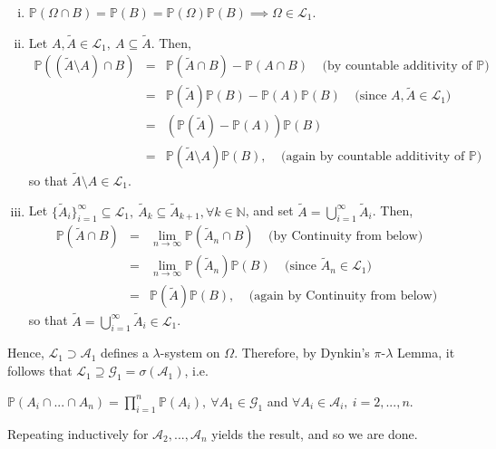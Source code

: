 \documentclass{article}
\begin{document}
\begin{enumerate}[(i)]
	\item $\mathbb{P}(\Omega \cap B) = \mathbb{P}(B) = \mathbb{P}(\Omega)\mathbb{P}(B) \implies \Omega \in \mathcal{L}_1$.
	\item Let $A,\tilde{A} \in \mathcal{L}_1, \ A \subseteq \tilde{A}$. Then,
	\begin{eqnarray}
	\nonumber
	\mathbb{P}((\tilde{A} \setminus A) \cap B) &=& \mathbb{P}(\tilde{A} \cap B) - \mathbb{P}(A \cap B) \ \ \ \ \ \text{(by countable additivity of $\mathbb{P}$)}\\
	\nonumber
	&=& \mathbb{P}(\tilde{A})\mathbb{P}(B) - \mathbb{P}(A)\mathbb{P}(B) \ \ \ \ \ \text{(since $A,\tilde{A} \in \mathcal{L}_1$)}\\
	\nonumber
	&=& 
	(\mathbb{P}(\tilde{A}) - \mathbb{P}(A))\mathbb{P}(B)\\
	\nonumber
	&=& \mathbb{P}(\tilde{A} \setminus A)\mathbb{P}(B), \ \ \ \ \ \text{(again by countable additivity of $\mathbb{P}$)}
	\end{eqnarray}
	so that $\tilde{A} \setminus A \in \mathcal{L}_1$.
	\item Let $\{\tilde{A}_i\}_{i=1}^{\infty} \subseteq \mathcal{L}_1, \ \tilde{A}_{k} \subseteq \tilde{A}_{k+1}, \forall k \in \mathbb{N}$, and set $\tilde{A} = \bigcup_{i=1}^{\infty}\tilde{A}_i$. Then,
	\begin{eqnarray}
	\nonumber
	\mathbb{P}(\tilde{A} \cap B) &=& \lim_{n\to\infty}\mathbb{P}(\tilde{A}_n \cap B) \ \ \ \ \ \text{(by Continuity from below)}\\
	\nonumber
	&=& \lim_{n\to\infty}\mathbb{P}(\tilde{A}_n)\mathbb{P}(B) \ \ \ \ \ \text{(since $\tilde{A}_n \in \mathcal{L}_1$)}\\
	\nonumber
	&=& \mathbb{P}(\tilde{A})\mathbb{P}(B), \ \ \ \ \ \text{(again by Continuity from below)}
	\end{eqnarray}
	so that $\tilde{A} = \bigcup_{i=1}^{\infty}\tilde{A}_i \in \mathcal{L}_1$.
\end{enumerate}
Hence, $\mathcal{L}_1 \supset \mathcal{A}_1$ defines a $\lambda$-system on $\Omega$. Therefore, by Dynkin's $\pi$-$\lambda$ Lemma, it follows that $\mathcal{L}_1 \supseteq \mathcal{G}_1 = \sigma(\mathcal{A}_1)$, i.e.
\begin{center}
	$\mathbb{P}(A_i \cap ... \cap A_n) = \prod_{i=1}^{n}\mathbb{P}(A_i), \ \forall A_1 \in \mathcal{G}_1$ and $\forall A_i \in \mathcal{A}_i, \ i=2,...,n$.
\end{center}
Repeating inductively for $\mathcal{A}_2,...,\mathcal{A}_n$ yields the result, and so we are done.\\
\end{document}
